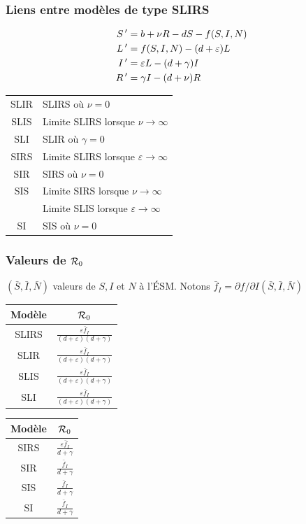 \documentclass[aspectratio=169]{beamer}\usepackage[]{graphicx}\usepackage[]{xcolor}
\begin{document}
\begin{frame}
\frametitle{Liens entre modèles de type SLIRS}
{ %
\begin{align*}
S\,'&=b+\nu R-dS-f(S,I,N) \\
L\,'&=f(S,I,N)-(d+\varepsilon) L \\
I\,'&=\varepsilon L-(d+\gamma)I \\
R\,'&=\gamma I-(d+\nu)R
\end{align*}}
\begin{center}
\begin{tabular}{c|l}
\hline
SLIR & SLIRS où $\nu=0$ \\
SLIS & Limite SLIRS lorsque $\nu\to\infty$ \\
SLI & SLIR où $\gamma=0$ \\
SIRS & Limite SLIRS lorsque $\varepsilon\to\infty$ \\
SIR & SIRS où $\nu=0$ \\
SIS & Limite SIRS lorsque $\nu\to\infty$ \\
& Limite SLIS lorsque $\varepsilon\to\infty$ \\
SI & SIS où $\nu=0$ 
\end{tabular}
\end{center}
\end{frame}

\begin{frame}
\frametitle{Valeurs de $\mathcal{R}_0$}
$(\bar S,\bar I,\bar N)$ valeurs de $S,I$ et $N$ à l'ÉSM. 
Notons $\bar f_I=\partial f/\partial I(\bar S,\bar I,\bar N)$
\begin{center}
\begin{tabular}{cc}
Modèle & $\mathcal{R}_0$ \\
\midrule
SLIRS & 
$\frac{\varepsilon\bar f_I}{(d+\varepsilon)(d+\gamma)}$ \\
SLIR & 
$\frac{\varepsilon\bar f_I}{(d+\varepsilon)(d+\gamma)}$ \\
SLIS & 
$\frac{\varepsilon\bar f_I}{(d+\varepsilon)(d+\gamma)}$ \\
SLI & 
$\frac{\varepsilon\bar f_I}{(d+\varepsilon)(d+\gamma)}$ \\
\end{tabular}\qquad\qquad
\begin{tabular}{cc}
Modèle & $\mathcal{R}_0$ \\
\midrule
SIRS & 
$\frac{\varepsilon\bar f_I}{d+\gamma}$ \\
SIR & $\frac{\bar f_I}{d+\gamma}$ \\
SIS & $\frac{\bar f_I}{d+\gamma}$ \\
SI & $ \frac{\bar f_I}{d+\gamma}$ 
\end{tabular}
\end{center}
\end{frame}
\end{document}
